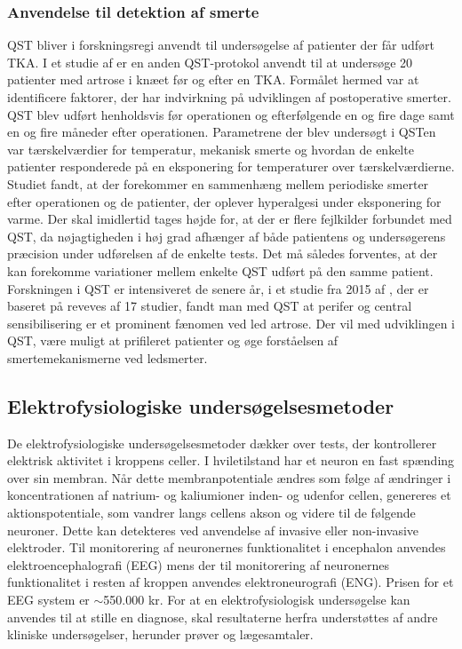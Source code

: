 \subsubsection{Anvendelse til detektion af smerte}
QST bliver i forskningsregi anvendt til undersøgelse af patienter der får udført TKA. I et studie af \citep{Martinez2007} er en anden QST-protokol anvendt til at undersøge 20 patienter med artrose i knæet før og efter en TKA. Formålet hermed var at identificere faktorer, der har indvirkning på udviklingen af postoperative smerter. QST blev udført henholdsvis før operationen og efterfølgende en og fire dage samt en og fire måneder efter operationen. Parametrene der blev undersøgt i QSTen var tærskelværdier for temperatur, mekanisk smerte og hvordan de enkelte patienter responderede på en eksponering for temperaturer over tærskelværdierne. Studiet fandt, at der forekommer en sammenhæng mellem periodiske smerter efter operationen og de patienter, der oplever hyperalgesi under eksponering for varme. \citep{Martinez2007} Der skal imidlertid tages højde for, at der er flere fejlkilder forbundet med QST, da nøjagtigheden i høj grad afhænger af både patientens og undersøgerens præcision under udførelsen af de enkelte tests. Det må således forventes, at der kan forekomme variationer mellem enkelte QST udført på den samme patient. \citep{Yarnitsky2006} Forskningen i QST er intensiveret de senere år, i et studie fra 2015 af , der er baseret på reveves af 17 studier, fandt man med QST at perifer og central sensibilisering er et prominent fænomen ved led artrose. Der vil med udviklingen i QST, være muligt at prifileret patienter og øge forståelsen af smertemekanismerne ved ledsmerter. \citep{Arendt-Nielsen2015}

\subsection{Elektrofysiologiske undersøgelsesmetoder}
De elektrofysiologiske undersøgelsesmetoder dækker over tests, der kontrollerer elektrisk aktivitet i kroppens celler. I hviletilstand har et neuron en fast spænding over sin membran. Når dette membranpotentiale ændres som følge af ændringer i koncentrationen af natrium- og kaliumioner inden- og udenfor cellen, genereres et aktionspotentiale, som vandrer langs cellens akson og videre til de følgende neuroner. Dette kan detekteres ved anvendelse af invasive eller non-invasive elektroder. Til monitorering af neuronernes funktionalitet i encephalon anvendes elektroencephalografi (EEG) mens der til monitorering af neuronernes funktionalitet i resten af kroppen anvendes elektroneurografi (ENG). Prisen for et EEG system er $\sim$550.000 kr. \citep{Biosemi2016} For at en elektrofysiologisk undersøgelse kan anvendes til at stille en diagnose, skal resultaterne herfra understøttes af andre kliniske undersøgelser, herunder prøver og lægesamtaler. \citep{Robinson2008} 

